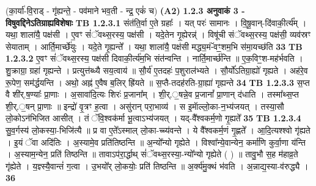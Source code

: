 \documentclass[17pt]{extarticle}
\begin{document}
                  \newline
                                    (का॒र्या॑-वि॒राड् - गृ॑ह्यन्ते॒ - पव॑माने भव॒ती - न्द्र॒ एकं॑ च) \textbf{(A2)} \newline \newline
                \textbf{ 1.2.3      अनुवाकं   3 - विषुवद्दिनेऽतिग्राह्यविशेषाः} \newline
                                \textbf{ TB 1.2.3.1} \newline
                  संत॑ति॒र्वा ए॒ते ग्रहाः᳚ । यत् परः॑ सामानः । वि॒षू॒वान्-दि॑वाकी॒र्त्य᳚म् । यथा॒ शाला॑यै॒ पक्ष॑सी । ए॒वꣳ सं॑ॅवथ्स॒रस्य॒ पक्ष॑सी । यदे॒तेन गृ॒ह्येरन्न्॑ । विषू॑ची संॅवथ्स॒रस्य॒ पक्ष॑सी॒ व्यव॑स्रꣳ सेयाताम् । आर्ति॒मार्च्छे॑युः । यदे॒ते गृ॒ह्यन्ते᳚ । यथा॒ शाला॑यै॒ पक्ष॑सी मद्ध्य॒मं-ॅवꣳ॒॒शम॒भि स॑मा॒यच्छ॑ति \textbf{ 33} \newline
                  \newline
                                \textbf{ TB 1.2.3.2} \newline
                  ए॒वꣳ सं॑ॅवथ्स॒रस्य॒ पक्ष॑सी दिवाकी॒र्त्य॑म॒भि संत॑न्वन्ति । नार्ति॒मार्च्छ॑न्ति ॥ ए॒क॒विꣳ॒॒श-मह॑र्भवति । शु॒क्राग्रा॒ ग्रहा॑ गृह्यन्ते । प्रत्युत्त॑ब्ध्यै सय॒त्वाय॑ ॥ सौ॒र्य॑ ए॒तदहः॑ प॒शुराल॑भ्यते । सौ॒र्यो॑ऽतिग्रा॒ह्यो॑ गृह्यते । अह॑रे॒व रू॒पेण॒ सम॑र्द्धयन्ति । अथो॒ अह्न॑ ए॒वैष ब॒लिर् ह्रि॑यते ॥ स॒प्तै-तदह॑रति-ग्रा॒ह्या॑ गृह्यन्ते \textbf{ 34} \newline
                  \newline
                                \textbf{ TB 1.2.3.3} \newline
                  स॒प्त वै शी॑र्.ष॒ण्याः᳚ प्रा॒णाः । अ॒सावा॑दि॒त्यः शिरः॑ प्र॒जाना᳚म् । शी॒र्.॒षन्ने॒व प्र॒जानां᳚ प्रा॒णान् द॑धाति । तस्मा᳚थ्स॒प्त शी॒र्.॒षन् प्रा॒णाः ॥ इन्द्रो॑ वृ॒त्रꣳ ह॒त्वा । असु॑रान् परा॒भाव्य॑ । स इ॒माॅल्लो॒का-न॒भ्य॑जयत् । तस्या॒सौ लो॒कोऽन॑भिजित आसीत् । तं ॅवि॒श्वक॑र्मा भू॒त्वाऽभ्य॑जयत् । यद्-वै᳚श्वकर्म॒णो गृ॒ह्यते᳚ \textbf{ 35} \newline
                  \newline
                                \textbf{ TB 1.2.3.4} \newline
                  सु॒व॒र्गस्य॑ लो॒कस्या॒-भिजि॑त्यै ॥ प्र वा ए॒ते᳚ऽस्माल् लो॒का-च्च्य॑वन्ते । ये वै᳚श्वकर्म॒णं गृ॒ह्णते᳚ । आ॒दि॒त्यश्श्वो गृ॑ह्यते । इ॒यं ॅवा अदि॑तिः । अ॒स्यामे॒व प्रति॑तिष्ठन्ति ॥ अ॒न्यो᳚न्यो गृह्येते । विश्वा᳚न्ये॒वान्येन॒ कर्मा॑णि कुर्वा॒णा य॑न्ति । अ॒स्याम॒न्येन॒ प्रति॑ तिष्ठन्ति ॥ तावाऽप॑रा॒र्द्धाथ् सं॑ॅवथ्स॒रस्या॒-न्यो᳚न्यो गृह्येते ( ) ॥ तावु॒भौ स॒ह म॑हाव्र॒ते गृ॑ह्येते । य॒ज्ञ्स्यै॒वान्तं॑ ग॒त्वा । उ॒भयो᳚र् लो॒कयोः॒ प्रति॑ तिष्ठन्ति ॥ अ॒र्क्य॑मु॒क्थं भ॑वति । अ॒न्नाद्य॒स्या-व॑रुद्ध्यै । \textbf{ 36} \newline
\end{document}
